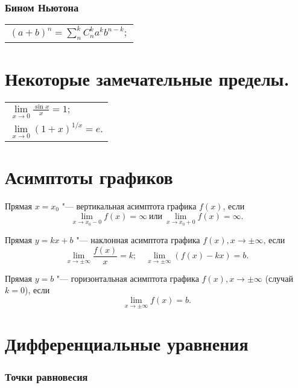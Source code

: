 \subsubsection{Бином Ньютона}
\begin{longtable}[l]{l}
$(a+b)^n=\sum^{k}_n C^k_n a^k b^{n-k};$
\end{longtable}

\section{Некоторые замечательные пределы.}
\begin{longtable}[l]{l}
$\lim\limits_{x\to0}\frac{\sin x}{x}=1;$
\\
$\lim\limits_{x\to0} (1+x)^{1/x}=e.$
\end{longtable}

\section{Асимптоты графиков}
\textbullet \quad
Прямая $x=x_0$ "--- вертикальная асимптота графика $f(x)$, если $$\lim\limits_{x\to x_0-0}f(x)=\infty\ \text{или}\ \lim\limits_{x\to x_0+0}f(x)=\infty.$$ 

\textbullet \quad
Прямая $y=kx+b$ "--- наклонная асимптота графика $f(x), x\to\pm\infty$, если $$\lim\limits_{x\to\pm\infty}\frac{f(x)}{x}=k; \quad \lim\limits_{x\to\pm\infty} (f(x)-kx)=b.$$

\textbullet \quad
Прямая $y=b$ "--- горизонтальная асимптота графика $f(x), x\to\pm\infty$ (случай $k=0$), если $$ \lim\limits_{x\to\pm\infty} f(x)=b.$$


\section{Дифференциальные уравнения}
\subsubsection {Точки равновесия}

